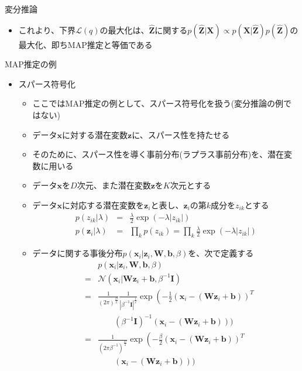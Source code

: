 \documentclass[dvipdfmx,notheorems,t]{beamer}
\begin{document}
\begin{frame}{変分推論}
\begin{itemize}
\begin{itemize}
		\item これより、下界$\mathcal{L}(q)$の最大化は、$\widehat{\bm{Z}}$に関する$p(\widehat{\bm{Z}} | \bm{X}) \propto p(\bm{X} | \widehat{\bm{Z}}) p(\widehat{\bm{Z}})$の最大化、\color{red}即ちMAP推定と等価\normalcolor である
	\end{itemize}
\end{itemize}

\end{frame}

\begin{frame}{MAP推定の例}

\begin{itemize}
	\item スパース符号化
	\begin{itemize}
		\item ここではMAP推定の例として、スパース符号化を扱う(\alert{変分推論の例ではない})
		\newline
		\item データ$\bm{x}$に対する潜在変数$\bm{z}$に、\alert{スパース性}を持たせる
		\item そのために、スパース性を導く事前分布(\alert{ラプラス事前分布})を、潜在変数に用いる
		\newline
		
		\item データ$\bm{x}$を$D$次元、また潜在変数$\bm{z}$を$K$次元とする
		\item データ$\bm{x}$に対応する潜在変数を$\bm{z}_i$と表し、$\bm{z}_i$の第$k$成分を$z_{ik}$とする
		\begin{eqnarray}
			p(z_{ik} | \lambda) &=& \frac{\lambda}{2} \exp \left( -\lambda |z_{ik}| \right) \\
			p(\bm{z}_i | \lambda) &=& \prod_k p(z_{ik}) = \prod_k \frac{\lambda}{2} \exp \left( -\lambda |z_{ik}| \right)
		\end{eqnarray}
		
		\item データに関する事後分布$p(\bm{x}_i | \bm{z}_i, \bm{W}, \bm{b}, \beta)$を、次で定義する
		\begin{eqnarray}
			&& p(\bm{x}_i | \bm{z}_i, \bm{W}, \bm{b}, \beta) \nonumber \\
			&=& \mathcal{N}(\bm{x}_i | \bm{W} \bm{z}_i + \bm{b}, \beta^{-1} \bm{I}) \\
			&=& \frac{1}{(2\pi)^\frac{D}{2}} \frac{1}{|\beta^{-1} \bm{I}|^\frac{1}{2}} \exp \left( -\frac{1}{2} \left( \bm{x}_i - \left( \bm{W} \bm{z}_i + \bm{b} \right) \right)^T \right. \nonumber \\
			&& \qquad \left( \beta^{-1} \bm{I} \right)^{-1} \left( \bm{x}_i - \left( \bm{W} \bm{z}_i + \bm{b} \right) \right) \bigg) \\
			&=& \frac{1}{(2\pi \beta^{-1})^\frac{D}{2}} \exp \left( -\frac{\beta}{2} \left( \bm{x}_i - \left( \bm{W} \bm{z}_i + \bm{b} \right) \right)^T \right. \nonumber \\
			&& \qquad \left( \bm{x}_i - \left( \bm{W} \bm{z}_i + \bm{b} \right) \right) \bigg)
		\end{eqnarray}
		

\end{itemize}
\end{itemize}
\end{frame}
\end{document}
